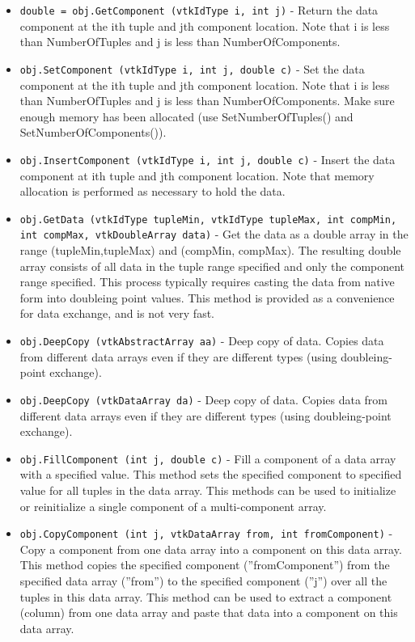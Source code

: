 \begin{itemize}
\item  \verb|double = obj.GetComponent (vtkIdType i, int j)| -  Return the data component at the ith tuple and jth component location.
 Note that i is less than NumberOfTuples and j is less than 
 NumberOfComponents.

\item  \verb|obj.SetComponent (vtkIdType i, int j, double c)| -  Set the data component at the ith tuple and jth component location.
 Note that i is less than NumberOfTuples and j is less than
  NumberOfComponents. Make sure enough memory has been allocated 
 (use SetNumberOfTuples() and SetNumberOfComponents()).

\item  \verb|obj.InsertComponent (vtkIdType i, int j, double c)| -  Insert the data component at ith tuple and jth component location. 
 Note that memory allocation is performed as necessary to hold the data.

\item  \verb|obj.GetData (vtkIdType tupleMin, vtkIdType tupleMax, int compMin, int compMax, vtkDoubleArray data)| -  Get the data as a double array in the range (tupleMin,tupleMax) and
 (compMin, compMax). The resulting double array consists of all data in
 the tuple range specified and only the component range specified. This
 process typically requires casting the data from native form into
 doubleing point values. This method is provided as a convenience for data
 exchange, and is not very fast.

\item  \verb|obj.DeepCopy (vtkAbstractArray aa)| -  Deep copy of data. Copies data from different data arrays even if
 they are different types (using doubleing-point exchange).

\item  \verb|obj.DeepCopy (vtkDataArray da)| -  Deep copy of data. Copies data from different data arrays even if
 they are different types (using doubleing-point exchange).

\item  \verb|obj.FillComponent (int j, double c)| -  Fill a component of a data array with a specified value. This method
 sets the specified component to specified value for all tuples in the
 data array.  This methods can be used to initialize or reinitialize a
 single component of a multi-component array.

\item  \verb|obj.CopyComponent (int j, vtkDataArray from, int fromComponent)| -  Copy a component from one data array into a component on this data array.
 This method copies the specified component (''fromComponent'') from the
 specified data array (''from'') to the specified component (''j'') over all
 the tuples in this data array.  This method can be used to extract
 a component (column) from one data array and paste that data into
 a component on this data array.


\end{itemize}
